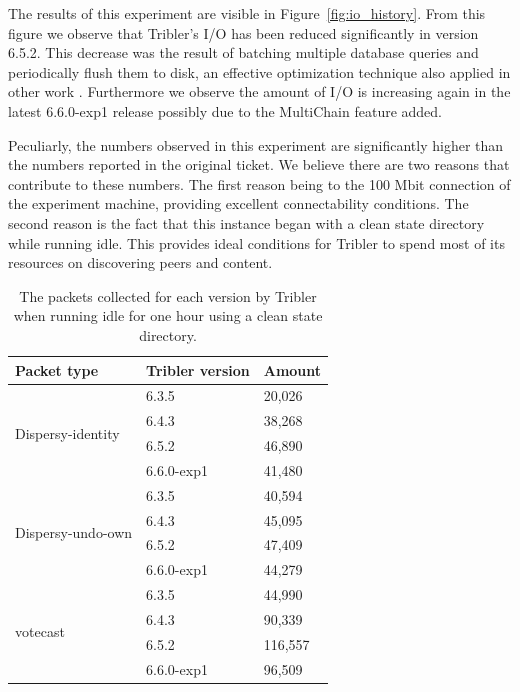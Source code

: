 The results of this experiment are visible in Figure~\ref{fig:io_history}.
From this figure we observe that Tribler's I/O has been reduced significantly in version 6.5.2.
This decrease was the result of batching multiple database queries and periodically flush them to disk, an effective optimization technique also applied in other work \cite{ouyang2011beyond, lin2009database}. 
Furthermore we observe the amount of I/O is increasing again in the latest 6.6.0-exp1 release possibly due to the MultiChain feature added. 

Peculiarly, the numbers observed in this experiment are significantly higher than the numbers reported in the original ticket.
We believe there are two reasons that contribute to these numbers.
The first reason being to the 100 Mbit connection of the experiment machine, providing excellent connectability conditions. 
The second reason is the fact that this instance began with a clean state directory while running idle.
This provides ideal conditions for Tribler to spend most of its resources on discovering peers and content.

\begin{table}[]
	\centering
	\caption{The packets collected for each version by Tribler when running idle for one hour using a clean state directory.}
	\label{table:packets_collected_idle}
	\begin{tabular}{|l|l|l|}
		\hline
		\textbf{Packet type}                         & \textbf{Tribler version} & \textbf{Amount}  \\ \hline
		\multirow{4}{*}{Dispersy-identity} & 6.3.5           & 20,026  \\ \cline{2-3} 
		& 6.4.3           & 38,268  \\ \cline{2-3} 
		& 6.5.2           & 46,890  \\ \cline{2-3} 
		& 6.6.0-exp1      & 41,480  \\ \hline
		\multirow{4}{*}{Dispersy-undo-own} & 6.3.5           & 40,594  \\ \cline{2-3} 
		& 6.4.3           & 45,095  \\ \cline{2-3} 
		& 6.5.2           & 47,409  \\ \cline{2-3} 
		& 6.6.0-exp1      & 44,279  \\ \hline
		\multirow{4}{*}{votecast}          & 6.3.5           & 44,990  \\ \cline{2-3} 
		& 6.4.3           & 90,339  \\ \cline{2-3} 
		& 6.5.2           & 116,557 \\ \cline{2-3} 
		& 6.6.0-exp1      & 96,509  \\ \hline
	\end{tabular}
\end{table}

